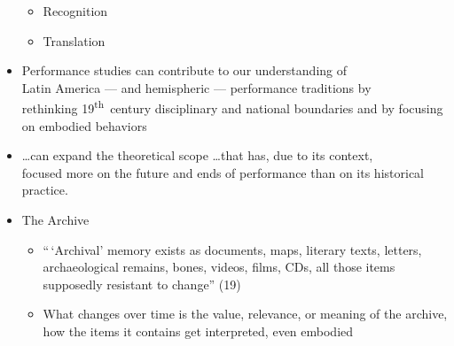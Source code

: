 \documentclass[12pt]{article}
\def\th{\textsuperscript{th}}
\begin{document}
\begin{itemize}
\begin{itemize}
                    \item Recognition
                    \item Translation
                \end{itemize}
                \item Performance studies can contribute to our understanding of \\ Latin America --- and hemispheric --- performance traditions by \\ rethinking 19\th\ century disciplinary and national boundaries and by focusing on embodied behaviors
                \item \dots can expand the theoretical scope \dots that has, due to its context,\\ focused more on the future and ends of performance than on its historical practice. 
                \item The Archive
                \begin{itemize}
                    \item ``\,`Archival' memory exists as documents, maps, literary texts, letters, archaeological remains, bones, videos, films, CDs, all those items supposedly resistant to change'' (19)
                    \item What changes over time is the value, relevance, or meaning of the archive, how the items it contains get interpreted, even embodied
                \end{itemize}
            \end{itemize}
\end{document}
